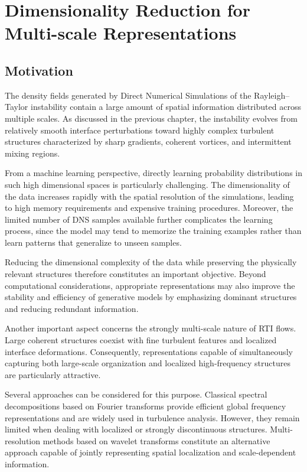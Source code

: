 \chapter{Dimensionality Reduction for Multi-scale Representations}

\section{Motivation}

The density fields generated by Direct Numerical Simulations of the Rayleigh--Taylor instability contain a large amount of spatial information distributed across multiple scales. As discussed in the previous chapter, the instability evolves from relatively smooth interface perturbations toward highly complex turbulent structures characterized by sharp gradients, coherent vortices, and intermittent mixing regions.

From a machine learning perspective, directly learning probability distributions in such high dimensional spaces is particularly challenging. The dimensionality of the data increases rapidly with the spatial resolution of the simulations, leading to high memory requirements and expensive training procedures. Moreover, the limited number of DNS samples available further complicates the learning process, since the model may tend to memorize the training examples rather than learn patterns that generalize to unseen samples.

Reducing the dimensional complexity of the data while preserving the physically relevant structures therefore constitutes an important objective. Beyond computational considerations, appropriate representations may also improve the stability and efficiency of generative models by emphasizing dominant structures and reducing redundant information.

Another important aspect concerns the strongly multi-scale nature of RTI flows. Large coherent structures coexist with fine turbulent features and localized interface deformations. Consequently, representations capable of simultaneously capturing both large-scale organization and localized high-frequency structures are particularly attractive.

Several approaches can be considered for this purpose. Classical spectral decompositions based on Fourier transforms provide efficient global frequency representations and are widely used in turbulence analysis. However, they remain limited when dealing with localized or strongly discontinuous structures. Multi-resolution methods based on wavelet transforms constitute an alternative approach capable of jointly representing spatial localization and scale-dependent information.

